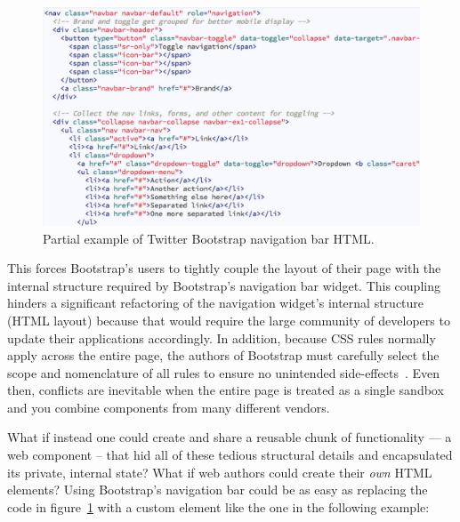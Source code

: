 \begin{figure}[htb]
\centering
 \includegraphics[width=\textwidth]{images/bootstrap_navbar_html.png}
\caption{Partial example of Twitter Bootstrap navigation bar HTML.}
\label{f:twbs1}
\end{figure}


This forces Bootstrap's users to tightly couple the layout of their page with the internal structure required by Bootstrap's navigation bar widget. 
This coupling hinders a significant refactoring of the navigation widget's internal structure (HTML layout) because that would require the large community of developers to update their applications accordingly.
In addition, because CSS rules normally apply across the entire page, the authors of Bootstrap must carefully select the scope and nomenclature of all rules to ensure no unintended side-effects~\cite{walton2014}. 
Even then, conflicts are inevitable when the entire page is treated as a single sandbox and you combine components from many different vendors. 

What if instead one could create and share a reusable chunk of functionality --- a web component -- that hid all of these tedious structural details and encapsulated its private, internal state? 
What if web authors could create their \textit{own} HTML elements?  
Using Bootstrap's navigation bar could be as easy as replacing the code in figure~\ref{f:twbs1} with a custom element like the one in the following example:

% 

